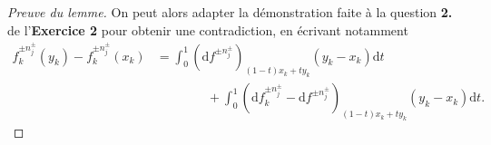 \documentclass[a4paper,12pt,openany]{article}
\theoremstyle{plain}
\theoremstyle{definition}
\newcommand{\dd}{\mathrm{d}}
\begin{document}
\begin{enumerate}[resume]
\begin{proof}[Preuve du lemme]
 


On peut alors adapter la d\'emonstration faite \`a la question \textbf{2.} de l'\textbf{Exercice 2} pour obtenir une contradiction, en \'ecrivant notamment
$$
\begin{aligned}
f_k^{\pm n_j^\pm}(y_k) - f_k^{\pm n_j^\pm}(x_k) &= \int_0^1 \left(\dd f^{\pm n_j^\pm}\right)_{(1-t)x_k + ty_k}(y_k - x_k) \dd t \\
& \quad \quad \quad \quad  +  \int_0^1 \left(\dd f_k^{\pm n_j^\pm} - \dd f^{\pm n_j^\pm}\right)_{(1-t)x_k + ty_k}(y_k - x_k) \dd t.
\end{aligned}
$$
\end{proof}

\end{enumerate}

\vspace{0.6cm}

 \vspace{1.5mm} 
\end{document}
